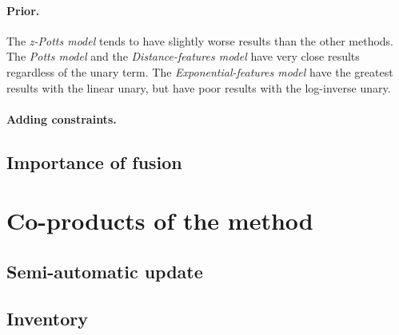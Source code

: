 \paragraph{Prior. \\}

The \textit{z-Potts model} tends to have slightly worse results than the other methods. The \textit{Potts model} and the \textit{Distance-features model} have very close results regardless of the unary term. The \textit{Exponential-features model} have the greatest results with the linear unary, but have poor results with the log-inverse unary.

\paragraph{Adding constraints. \\}

\subsection{Importance of fusion}

\section{Co-products of the method}
\subsection{Semi-automatic update}
\subsection{Inventory}




\stopcontents[chapters]